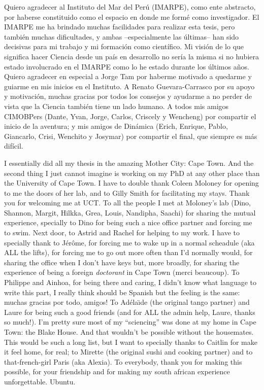 Quiero agradecer al Instituto del Mar del Perú (IMARPE), como ente abstracto, por haberse constituido como el espacio en donde me formé como investigador. El IMARPE me ha brindado muchas facilidades para realizar esta tesis, pero también muchas dificultades, y ambas --especialmente las últimas-- han sido decisivas para mi trabajo y mi formación como científico. Mi visión de lo que significa hacer Ciencia desde un país en desarrollo no sería la misma si no hubiera estado involucrado en el IMARPE como lo he estado durante los últimos años. Quiero agradecer en especial a Jorge Tam por haberme motivado a quedarme y guiarme en mis inicios en el Instituto. A Renato Guevara-Carrasco por su apoyo y motivación, muchas gracias por todos los consejos y ayudarme a no perder de vista que la Ciencia también tiene un lado humano. A todos mis amigos CIMOBPers (Dante, Yvan, Jorge, Carlos, Criscely y Wencheng) por compartir el inicio de la aventura; y mis amigos de Dinámica (Erich, Enrique, Pablo, Giancarlo, Crisi, Wenchito y Josymar) por compartir el final, que siempre es más difícil. 

I essentially did all my thesis in the amazing Mother City: Cape Town. And the second thing I just cannot imagine is working on my PhD at any other place than the University of Cape Town. I have to double thank Coleen Moloney for opening to me the doors of her lab, and to Gilly Smith for facilitating my stays. Thank you for welcoming me at UCT. To all the people I met at Moloney's lab (Dino, Shannon, Margit, Hilkka, Grea, Louis, Nandipha, Saachi) for sharing the mutual experience, specially to Dino for being such a nice office partner and forcing me to swim. Next door, to Astrid and Rachel for helping to my work. I have to specially thank to J\'{e}r\^{o}me, for forcing me to wake up in a normal scheadule (aka ALL the lifts), for forcing me to go out more often than I'd normally would, for sharing the office when I don't have keys but, more broadly, for sharing the experience of being a foreign \emph{doctorant} in Cape Town (merci beaucoup). To Philippe and Ainhoa, for being there and caring, I didn't know what language to write this part, I really think should be Spanish but the feeling is the same: muchas gracias por todo, amigos! To Ad\'ela\"{\i}de (the original tango partner) and Laure for being such a good friends (and for ALL the admin help, Laure, thanks so much!). I'm pretty sure most of my ``sciencing'' was done at my home in Cape Town: the Blake House. And that wouldn't be possible without the housemates. This would be such a long list, but I want to specially thanks to Caitlin for make it feel home, for real; to Mirette (the original sushi and cooking partner) and to that-french-girl Paris (aka Alexia). To everybody, thank you for making this possible, for your friendship and for making my south african experience unforgettable. Ubuntu.

